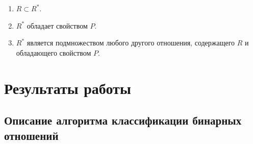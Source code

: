 \documentclass[spec, och, labwork]{shiza}
\begin{document}
        \begin{enumerate}
            \item $R \subset R^*$.
            \item $R^*$ обладает свойством $P$.
            \item $R^*$ является подмножеством любого другого отношения, содержащего $R$ и обладающего свойством $P$.
        \end{enumerate}

\section{Результаты работы}

        \subsection{Описание алгоритма классификации бинарных отношений}
\end{document}
